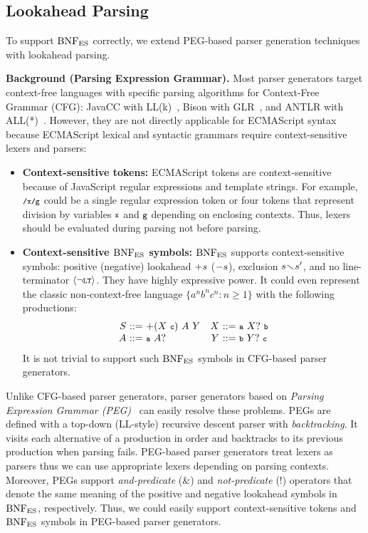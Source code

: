 \subsection{Lookahead Parsing}
To support \( \text{BNF}_{\text{ES}} \) correctly, we extend PEG-based parser generation
techniques with lookahead parsing.

\smallskip

\textbf{Background (Parsing Expression Grammar).}
Most parser generators target context-free languages with specific parsing
algorithms for Context-Free Grammar (CFG): JavaCC with LL(k)~,
Bison with GLR~, and ANTLR with
ALL(*)~.  However, they are not directly applicable for
ECMAScript syntax because ECMAScript lexical and syntactic grammars require
context-sensitive lexers and parsers:
\begin{itemize}[leftmargin=0.5cm]
  \item \textbf{Context-sensitive tokens:}
    ECMAScript tokens are context-sensitive because of JavaScript regular
    expressions and template strings.  For example, \( \texttt{\footnotesize/x/g} \) could be a
    single regular expression token or four tokens that represent division by
    variables \( \texttt{\footnotesize x} \) and \( \texttt{\footnotesize g} \) depending on enclosing contexts.
    Thus, lexers should be evaluated during parsing not before parsing.
  \item \textbf{Context-sensitive \( \text{BNF}_{\text{ES}} \) symbols:}
    \( \text{BNF}_{\text{ES}} \) supports context-sensitive symbols: positive (negative)
    lookahead \( +s \) (\( -s \)), exclusion \( s \!\smallsetminus\! s' \),
    and no line-terminator \( \left<\neg\texttt{\footnotesize LT}\right> \).  They have highly expressive power. It
    could even represent the classic non-context-free language \( \{ a^n b^n c^n
    : n \geq 1 \} \) with the following productions:
    \[
      \begin{array}{r@{~}c@{~}lr@{~}c@{~}l}
        \NT{S} &::=& +(\NT{X}~\T{c})~\NT{A}~\NT{Y}&
        \NT{X} &::=& \T{a}~\NT{X}?~\T{b}\\
        \NT{A} &::=& \T{a}~\NT{A}?&
        \NT{Y} &::=& \T{b}~\NT{Y}?~\T{c}\\
      \end{array}
    \]
    It is not trivial to support such \( \text{BNF}_{\text{ES}} \) symbols in CFG-based
    parser generators.
\end{itemize}

Unlike CFG-based parser generators, parser generators based on \textit{Parsing
Expression Grammar (PEG)}~\cite{peg} can easily resolve these problems.  PEGs
are defined with a top-down (LL-style) recursive descent parser with
\textit{backtracking}.  It visits each alternative of a production in order and
backtracks to its previous production when parsing fails.  PEG-based parser
generators treat lexers as parsers thus we can use appropriate lexers depending
on parsing contexts.  Moreover, PEGs support \textit{and-predicate} (\&) and
\textit{not-predicate} (!) operators that denote the same meaning of the
positive and negative lookahead symbols in \( \text{BNF}_{\text{ES}} \), respectively. Thus, we
could easily support context-sensitive tokens and \( \text{BNF}_{\text{ES}} \) symbols in
PEG-based parser generators.

